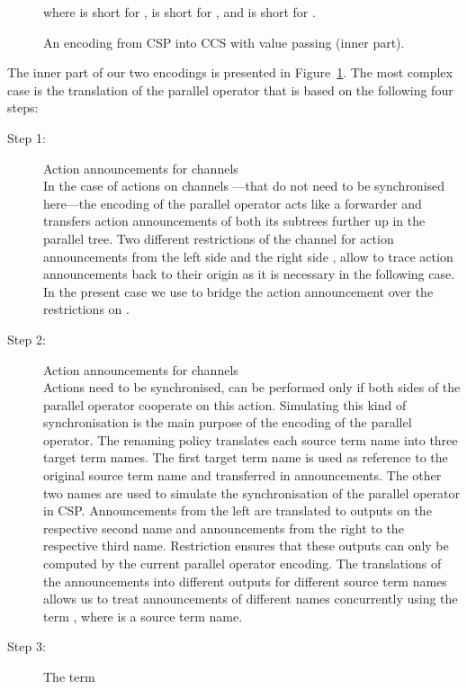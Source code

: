 \documentclass[copyright,creativecommons]{eptcs}
\begin{document}
\begin{figure}[htp]
	
	where  is short for ,  is short for , and  is short for .
	\caption{An encoding from CSP into CCS with value passing (inner part).}
	\label{fig:innerEncoding}
\end{figure}
The inner part of our two encodings is presented in Figure~\ref{fig:innerEncoding}. The most complex case is the translation of the parallel operator  that is based on the following four steps:
\begin{description}
	\item[Step 1:] Action announcements for channels \\
		In the case of actions on channels ---that do not need to be synchronised here---the encoding of the parallel operator acts like a forwarder and transfers action announcements of both its subtrees further up in the parallel tree.
		Two different restrictions of the channel for action announcements  from the left side  and the right side , allow to trace action announcements back to their origin as it is necessary in the following case.
		In the present case we use  to bridge the action announcement over the restrictions on .
	\item[Step 2:] Action announcements for channels \\
		Actions  need to be synchronised, \ie can be performed only if both sides of the parallel operator cooperate on this action. Simulating this kind of synchronisation is the main purpose of the encoding of the parallel operator.
		The renaming policy  translates each source term name into three target term names. The first target term name is used as reference to the original source term name and transferred in announcements. The other two names are used to simulate the synchronisation of the parallel operator in CSP. Announcements from the left are translated to outputs on the respective second name and announcements from the right to the respective third name. Restriction ensures that these outputs can only be computed by the current parallel operator encoding. The translations of the announcements into different outputs for different source term names allows us to treat announcements of different names concurrently using the term , where  is a source term name.
	\item[Step 3:] The term \\

\end{description}
\end{document}
